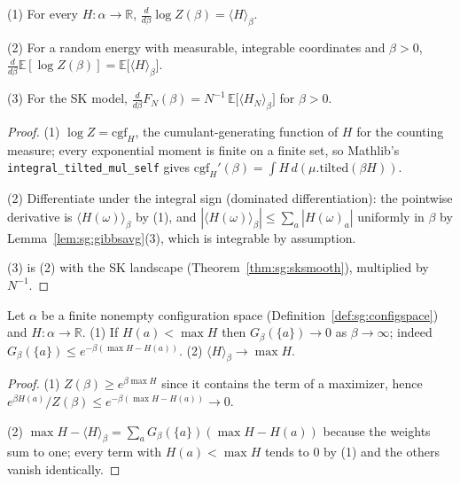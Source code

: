 \begin{theorem}\label{thm:sg:deriv}
  \leanok
(1) For every $H:\alpha\to\mathbb R$, $\frac{d}{d\beta}\log Z(\beta)=\langle H\rangle_\beta$.

(2) For a random energy with measurable, integrable coordinates and $\beta>0$,
$\frac{d}{d\beta}\mathbb E[\log Z(\beta)]=\mathbb E\big[\langle H\rangle_\beta\big]$.

(3) For the SK model, $\frac d{d\beta}F_N(\beta)=N^{-1}\,\mathbb E\big[\langle H_N\rangle_\beta\big]$ for $\beta>0$.
\end{theorem}

\begin{proof}
  \leanok

(1) $\log Z=\mathrm{cgf}_H$, the cumulant-generating function of $H$ for the counting measure; every exponential moment
is finite on a finite set, so Mathlib's \texttt{integral\_tilted\_mul\_self} gives
$\mathrm{cgf}_H'(\beta)=\int H\,d(\mu.\mathrm{tilted}(\beta H))$. 

(2) Differentiate under the integral sign
(dominated differentiation): the pointwise derivative is $\langle H(\omega)\rangle_\beta$ by (1), and
$|\langle H(\omega)\rangle_\beta|\le\sum_a|H(\omega)_a|$ uniformly in $\beta$ by Lemma~\ref{lem:sg:gibbsavg}(3), which
is integrable by assumption. 

(3) is (2) with the SK landscape (Theorem~\ref{thm:sg:sksmooth}), multiplied by $N^{-1}$.
\end{proof}

\begin{theorem}\label{thm:sg:concentration}
  \leanok
Let $\alpha$ be a finite nonempty configuration space (Definition~\ref{def:sg:configspace}) and $H:\alpha\to\mathbb R$. (1) If $H(a)<\max H$ then $G_\beta(\{a\})\to0$ as
$\beta\to\infty$; indeed $G_\beta(\{a\})\le e^{-\beta(\max H-H(a))}$. (2) $\langle H\rangle_\beta\to\max H$.
\end{theorem}

\begin{proof}
  \leanok
(1) $Z(\beta)\ge e^{\beta\max H}$ since it contains the term of a maximizer, hence
$e^{\beta H(a)}/Z(\beta)\le e^{-\beta(\max H-H(a))}\to0$. 

(2) $\max H-\langle H\rangle_\beta=\sum_aG_\beta(\{a\})(\max H-H(a))$
because the weights sum to one; every term with $H(a)<\max H$ tends to $0$ by (1) and the others vanish identically.
\end{proof}


